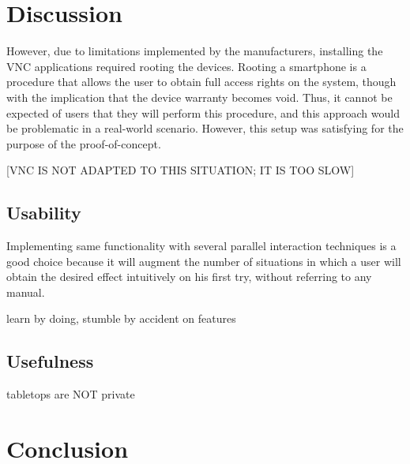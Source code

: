 \chapter{Discussion}
\label{discussion}




However, due to limitations implemented by the manufacturers, installing the VNC applications required rooting the devices.
Rooting a smartphone is a procedure that allows the user to obtain full access rights on the system, though with the implication that the device warranty becomes void.
Thus, it cannot be expected of users that they will perform this procedure, and this approach would be problematic in a real-world scenario.
However, this setup was satisfying for the purpose of the proof-of-concept.

[VNC IS NOT ADAPTED TO THIS SITUATION; IT IS TOO SLOW]



\section{Usability}

Implementing same functionality with several parallel interaction techniques is a good choice because it will augment the number of situations in which a user will obtain the desired effect intuitively on his first try, without referring to any manual.


learn by doing, stumble by accident on features

\section{Usefulness}

tabletops are NOT private


\chapter{Conclusion}
\label{conclusion}